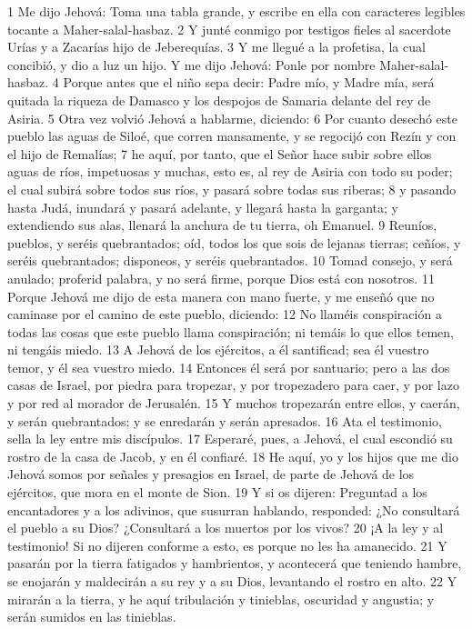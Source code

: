 1 Me dijo Jehová: Toma una tabla grande, y escribe en ella con caracteres legibles tocante a Maher-salal-hasbaz.
2 Y junté conmigo por testigos fieles al sacerdote Urías y a Zacarías hijo de Jeberequías.
3 Y me llegué a la profetisa, la cual concibió, y dio a luz un hijo. Y me dijo Jehová: Ponle por nombre Maher-salal-hasbaz.
4 Porque antes que el niño sepa decir: Padre mío, y Madre mía, será quitada la riqueza de Damasco y los despojos de Samaria delante del rey de Asiria.
5 Otra vez volvió Jehová a hablarme, diciendo:
6 Por cuanto desechó este pueblo las aguas de Siloé, que corren mansamente, y se regocijó con Rezín y con el hijo de Remalías;
7 he aquí, por tanto, que el Señor hace subir sobre ellos aguas de ríos, impetuosas y muchas, esto es, al rey de Asiria con todo su poder; el cual subirá sobre todos sus ríos, y pasará sobre todas sus riberas;
8 y pasando hasta Judá, inundará y pasará adelante, y llegará hasta la garganta; y extendiendo sus alas, llenará la anchura de tu tierra, oh Emanuel.
9 Reuníos, pueblos, y seréis quebrantados; oíd, todos los que sois de lejanas tierras; ceñíos, y seréis quebrantados; disponeos, y seréis quebrantados.
10 Tomad consejo, y será anulado; proferid palabra, y no será firme, porque Dios está con nosotros.
11 Porque Jehová me dijo de esta manera con mano fuerte, y me enseñó que no caminase por el camino de este pueblo, diciendo:
12 No llaméis conspiración a todas las cosas que este pueblo llama conspiración; ni temáis lo que ellos temen, ni tengáis miedo.
13 A Jehová de los ejércitos, a él santificad; sea él vuestro temor, y él sea vuestro miedo.
14 Entonces él será por santuario; pero a las dos casas de Israel, por piedra para tropezar, y por tropezadero para caer, y por lazo y por red al morador de Jerusalén.
15 Y muchos tropezarán entre ellos, y caerán, y serán quebrantados; y se enredarán y serán apresados.
16 Ata el testimonio, sella la ley entre mis discípulos.
17 Esperaré, pues, a Jehová, el cual escondió su rostro de la casa de Jacob, y en él confiaré. 
18 He aquí, yo y los hijos que me dio Jehová somos por señales y presagios en Israel, de parte de Jehová de los ejércitos, que mora en el monte de Sion.
19 Y si os dijeren: Preguntad a los encantadores y a los adivinos, que susurran hablando, responded: ¿No consultará el pueblo a su Dios? ¿Consultará a los muertos por los vivos?
20 ¡A la ley y al testimonio! Si no dijeren conforme a esto, es porque no les ha amanecido.
21 Y pasarán por la tierra fatigados y hambrientos, y acontecerá que teniendo hambre, se enojarán y maldecirán a su rey y a su Dios, levantando el rostro en alto.
22 Y mirarán a la tierra, y he aquí tribulación y tinieblas, oscuridad y angustia; y serán sumidos en las tinieblas.

